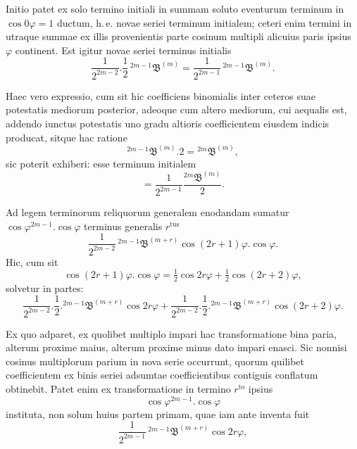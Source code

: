 \par\noindent{}%
\hspace*{\parindent}Initio patet ex solo termino initiali in summam soluto eventurum terminum in
$\cos 0\varphi = 1$ ductum, h.\,e. novae seriei terminum initialem; ceteri enim
termini in utraque summae ex illis provenientis parte cosinum multipli alicuius
paris ipsius $\varphi$ continent. Est igitur novae seriei terminus initialis
\[
\frac{1}{2^{2m-2}} . \frac{1}{2}\,{}^{2m-1}\mathfrak{B}^{(m)}
= \frac{1}{2^{2m-1}}\,{}^{2m-1}\mathfrak{B}^{(m)}.
\]

\par\noindent Haec vero expressio, cum sit hic coefficiens binomialis inter ceteros suae
potestatis mediorum posterior, adeoque cum altero mediorum, cui aequalis est,
addendo iunctus potestatis uno gradu altioris coefficientem eiusdem indicis
producat, sitque hac ratione
\[
{}^{2m-1}\mathfrak{B}^{(m)} .  2 = {}^{2m}\mathfrak{B}^{(m)},
\]
sic poterit exhiberi: esse terminum initialem
\[
= \frac{1}{2^{2m-1}}\frac{{}^{2m}\mathfrak{B}^{(m)}}{2}.
\]

\par\noindent Ad legem terminorum reliquorum generalem enodandam sumatur\hfill\mbox{}\linebreak $\cos\varphi^{2m-1} . \cos\varphi$
terminus generalis $r^{\text{tus}}$
\[
\frac{1}{2^{2m-2}}\,{}^{2m-1}\mathfrak{B}^{(m+r)}\cos(2r+1)\varphi . \cos\varphi.
\]
Hic, cum sit
\[
\cos(2r+1)\varphi . \cos\varphi = \tfrac{1}{2}\cos 2r\varphi + \tfrac{1}{2}\cos(2r+2)\varphi,
\]
solvetur in partes:
\[
\frac{1}{2^{2m-2}} . \frac{1}{2} . {}^{2m-1}\mathfrak{B}^{(m+r)}\cos 2r\varphi
+ \frac{1}{2^{2m-2}} . \frac{1}{2} . {}^{2m-1}\mathfrak{B}^{(m+r)}\cos(2r+2)\varphi.
\]

Ex quo adparet, ex quolibet multiplo impari hac transformatione bina paria,
alterum proxime maius, alterum proxime minus dato impari enasci. Sic nonnisi
cosinus multiplorum parium in nova serie occurrunt, quorum quilibet coefficientem
ex binis seriei adsumtae coefficientibus contiguis conflatum obtinebit. Patet
enim ex transformatione in termino $r^{\text{to}}$ ipsius
\[
\cos\varphi^{2m-1} . \cos\varphi
\]
instituta, non solum huius partem primam, quae iam ante inventa fuit
\[
\frac{1}{2^{2m-1}}\,{}^{2m-1}\mathfrak{B}^{(m+r)}\cos 2r\varphi,
\]
